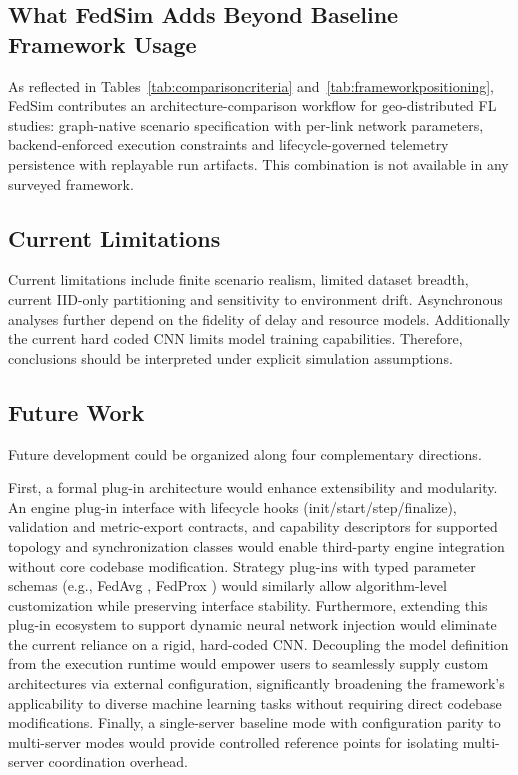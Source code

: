 \documentclass[conference]{IEEEtran}
\begin{document}
\subsection{What FedSim Adds Beyond Baseline Framework Usage}
As reflected in Tables~\ref{tab:comparisoncriteria} and~\ref{tab:frameworkpositioning}, FedSim contributes an architecture-comparison workflow for geo-distributed FL studies: graph-native scenario specification with per-link network parameters, backend-enforced execution constraints and lifecycle-governed telemetry persistence with replayable run artifacts. This combination is not available in any surveyed framework.

\subsection{Current Limitations}
Current limitations include finite scenario realism, limited dataset breadth, current IID-only partitioning and sensitivity to environment drift. Asynchronous analyses further depend on the fidelity of delay and resource models. Additionally the current hard coded CNN limits model training capabilities. Therefore, conclusions should be interpreted under explicit simulation assumptions.

\subsection{Future Work}

Future development could be organized along four complementary directions.

First, a formal plug-in architecture would enhance extensibility and modularity. An engine plug-in interface with lifecycle hooks (init/start/step/finalize), validation and metric-export contracts, and capability descriptors for supported topology and synchronization classes would enable third-party engine integration without core codebase modification. Strategy plug-ins with typed parameter schemas (e.g., FedAvg \cite{mcmahan2017}, FedProx \cite{li2020fedprox}) would similarly allow algorithm-level customization while preserving interface stability. Furthermore, extending this plug-in ecosystem to support dynamic neural network injection would eliminate the current reliance on a rigid, hard-coded CNN. Decoupling the model definition from the execution runtime would empower users to seamlessly supply custom architectures via external configuration, significantly broadening the framework's applicability to diverse machine learning tasks without requiring direct codebase modifications. Finally, a single-server baseline mode with configuration parity to multi-server modes would provide controlled reference points for isolating multi-server coordination overhead.
\end{document}
